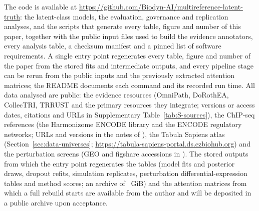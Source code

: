 The code is available at \url{https://github.com/Biodyn-AI/multireference-latent-truth}: the latent-class models, the evaluation, governance and replication analyses, and the scripts that generate every table, figure and number of this paper, together with the public input files used to build the evidence annotators, every analysis table, a checksum manifest and a pinned list of software requirements.
A single entry point regenerates every table, figure and number of the paper from the stored fits and intermediate outputs, and every pipeline stage can be rerun from the public inputs and the previously extracted attention matrices; the README documents each command and its recorded run time.
All data analysed are public: the evidence resources (OmniPath, DoRothEA, CollecTRI, TRRUST and the primary resources they integrate; versions or access dates, citations and URLs in Supplementary Table~\ref{tab:S-sources}), the ChIP-seq references (the Harmonizome ENCODE library and the ENCODE regulatory networks; URLs and versions in the notes of ), the Tabula Sapiens atlas (Section~\ref{sec:data-universes}; \url{https://tabula-sapiens-portal.ds.czbiohub.org}) and the perturbation screens (GEO and figshare accessions in ).
The stored outputs from which the entry point regenerates the tables (model fits and posterior draws, dropout refits, simulation replicates, perturbation differential-expression tables and method scores; an archive of \nArchiveGiB{}~GiB) and the attention matrices from which a full rebuild starts are available from the author and will be deposited in a public archive upon acceptance.
